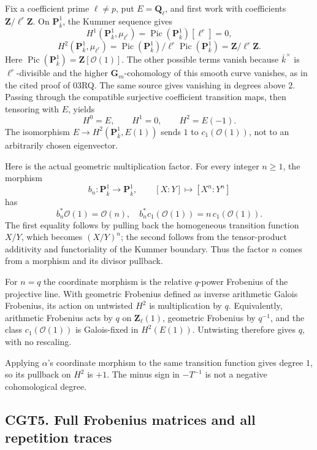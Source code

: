 Fix a coefficient prime \(\ell\ne p\), put \(E=\mathbf Q_\ell\), and
first work with coefficients \(\mathbf Z/\ell^r\mathbf Z\). On
\(\mathbf P^1_{\bar k}\), the Kummer sequence gives \[
H^1(\mathbf P^1_{\bar k},\mu_{\ell^r})
=\operatorname{Pic}(\mathbf P^1_{\bar k})[\ell^r]=0,
\] \[
H^2(\mathbf P^1_{\bar k},\mu_{\ell^r})
=\operatorname{Pic}(\mathbf P^1_{\bar k})/
\ell^r\operatorname{Pic}(\mathbf P^1_{\bar k})
=\mathbf Z/\ell^r\mathbf Z.
\tag{CGT4.1}
\] Here
\(\operatorname{Pic}(\mathbf P^1_{\bar k})=\mathbf Z[\mathcal O(1)]\).
The other possible terms vanish because \(\bar k^\times\) is
\(\ell^r\)-divisible and the higher \(\mathbf G_m\)-cohomology of this
smooth curve vanishes, as in the cited proof of 03RQ. The same source
gives vanishing in degrees above \(2\). Passing through the compatible
surjective coefficient transition maps, then tensoring with \(E\),
yields \[
H^0=E,\qquad H^1=0,\qquad H^2=E(-1).
\tag{CGT4.2}
\] The isomorphism \(E\to H^2(\mathbf P^1_{\bar k},E(1))\) sends \(1\)
to \(c_1(\mathcal O(1))\), not to an arbitrarily chosen eigenvector.

Here is the actual geometric multiplication factor. For every integer
\(n\ge1\), the morphism \[
b_n:\mathbf P^1_{\bar k}\to\mathbf P^1_{\bar k},
\qquad [X:Y]\longmapsto[X^n:Y^n]
\tag{CGT4.3}
\] has \[
b_n^*\mathcal O(1)=\mathcal O(n),\quad
b_n^*c_1(\mathcal O(1))=n\,c_1(\mathcal O(1)).
\tag{CGT4.4}
\] The first equality follows by pulling back the homogeneous transition
function \(X/Y\), which becomes \((X/Y)^n\); the second follows from the
tensor-product additivity and functoriality of the Kummer boundary. Thus
the factor \(n\) comes from a morphism and its divisor pullback.

For \(n=q\) the coordinate morphism is the relative \(q\)-power
Frobenius of the projective line. With geometric Frobenius defined as
inverse arithmetic Galois Frobenius, its action on untwisted \(H^2\) is
multiplication by \(q\). Equivalently, arithmetic Frobenius acts by
\(q\) on \(\mathbf Z_\ell(1)\), geometric Frobenius by \(q^{-1}\), and
the class \(c_1(\mathcal O(1))\) is Galois-fixed in \(H^2(E(1))\).
Untwisting therefore gives \(q\), with no rescaling.

Applying \(\alpha\)'s coordinate morphism to the same transition
function gives degree \(1\), so its pullback on \(H^2\) is \(+1\). The
minus sign in \(-T^{-1}\) is not a negative cohomological degree.

\subsection{CGT5. Full Frobenius matrices and all repetition
traces}\label{cgt5.-full-frobenius-matrices-and-all-repetition-traces}

